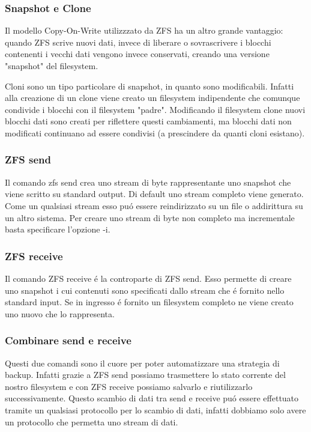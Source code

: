 \documentclass{beamer}
\begin{document}
\begin{frame}
\frametitle{Snapshot e Clone}
Il modello Copy-On-Write utilizzzato da ZFS ha un altro grande vantaggio: quando ZFS scrive nuovi dati, invece di liberare o sovrascrivere i blocchi contenenti i vecchi dati vengono invece conservati, creando una versione "snapshot" del filesystem.
\end{frame}

\begin{frame}
Cloni sono un tipo particolare di snapshot, in quanto sono modificabili. Infatti alla creazione di un clone viene creato un filesystem indipendente che comunque condivide i blocchi con il filesystem "padre". Modificando il filesystem clone nuovi blocchi dati sono creati per riflettere questi cambiamenti, ma blocchi dati non modificati continuano ad essere condivisi (a prescindere da quanti cloni esistano).
\end{frame}

\begin{frame}
\frametitle{ZFS send}
Il comando zfs send crea uno stream di byte rappresentante uno snapshot che viene scritto su standard output. Di default uno stream completo viene generato. Come un qualsiasi stream esso pu\'o essere reindirizzato su un file o addirittura su un altro sistema.
\newline
Per creare uno stream di byte non completo ma incrementale basta specificare l'opzione -i.
\end{frame}

\begin{frame}
\frametitle{ZFS receive}
Il comando ZFS receive \'e la controparte di ZFS send. Esso permette di creare uno snapshot i cui contenuti sono specificati dallo stream che \'e fornito nello standard input. Se in ingresso \'e fornito un filesystem completo ne viene creato uno nuovo che lo rappresenta.
\end{frame}

\begin{frame}
\frametitle{Combinare send e receive}
Questi due comandi sono il cuore per poter automatizzare una strategia di backup. Infatti grazie a ZFS send possiamo trasmettere lo stato corrente del nostro filesystem e con ZFS receive possiamo salvarlo e riutilizzarlo successivamente.
Questo scambio di dati tra send e receive pu\'o essere effettuato tramite un qualsiasi protocollo per lo scambio di dati, infatti dobbiamo solo avere un protocollo che permetta uno stream di dati.
\end{frame}
\end{document}
